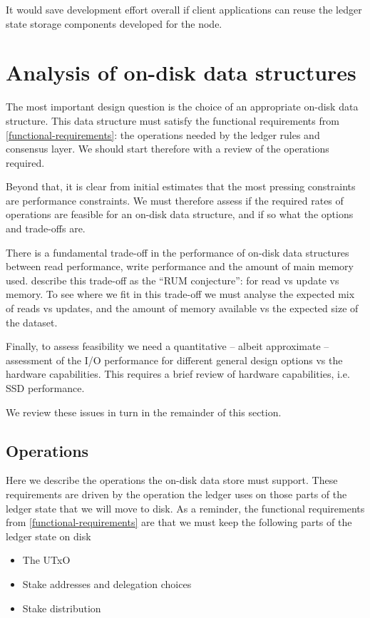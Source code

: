 \documentclass[11pt,a4paper]{article}
\begin{document}
It would save development effort overall if client applications can reuse the
ledger state storage components developed for the node.

\section{Analysis of on-disk data structures}
\label{constraints}

The most important design question is the choice of an appropriate on-disk data
structure. This data structure must satisfy the functional requirements from
\cref{functional-requirements}: the operations needed by the ledger rules and
consensus layer. We should start therefore with a review of the operations
required.

Beyond that, it is clear from initial estimates that the most pressing
constraints are performance constraints. We must therefore assess if the
required rates of operations are feasible for an on-disk data structure, and if
so what the options and trade-offs are.

There is a fundamental trade-off in the performance of on-disk data structures
between read performance, write performance and the amount of main memory used.
\cite{rum-conjecture} describe this trade-off as the ``RUM conjecture'': for
read vs update vs memory. To see where we fit in this trade-off we must analyse
the expected mix of reads vs updates, and the amount of memory available vs the
expected size of the dataset.

Finally, to assess feasibility we need a quantitative -- albeit approximate
-- assessment of the I/O performance for different general design options vs
the hardware capabilities. This requires a brief review of hardware
capabilities, i.e. SSD performance.

We review these issues in turn in the remainder of this section.

\subsection{Operations}
\label{operations}

Here we describe the operations the on-disk data store must support. These
requirements are driven by the operation the ledger uses on those parts of
the ledger state that we will move to disk. As a reminder, the functional
requirements from \cref{functional-requirements} are that we must keep the
following parts of the ledger state on disk
\begin{itemize}
\setlength{\itemsep}{0pt}%
\setlength{\parskip}{1pt}%
\item The UTxO
\item Stake addresses and delegation choices
\item Stake distribution
\end{itemize}
\end{document}

